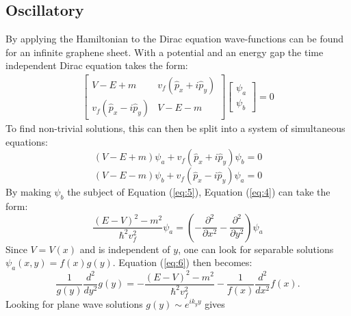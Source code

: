 			\subsection{Oscillatory}
			\label{Wave-functions - Oscillitary}
			By applying the Hamiltonian to the Dirac equation wave-functions can be found for an infinite graphene sheet. With a potential and an energy gap the time independent Dirac equation takes the form:
			\begin{align}
				\left[\begin{array}{ccc}
				V-E+m&v_{f}\left(\hat{p}_{x}+i\hat{p}_{y}\right)\\
				v_{f}\left(\hat{p}_{x}-i\hat{p}_{y}\right)&V-E-m
				\end{array}\right]
				\left[\begin{array}{ccc}
				\psi_a\\
				\psi_b
				\end{array}\right]
				=0
			\end{align}
			To find non-trivial solutions, this can then be split into a system of simultaneous equations:
			\begin{equation}\label{eq:4}
				\left(V-E+m\right)\psi_{a}+ v_{f}\left(\hat{p}_{x}+i\hat{p}_{y}\right)\psi_{b}=0
			\end{equation}
			\begin{equation}\label{eq:5}
				\left(V-E-m\right)\psi_{b}+v_{f}\left(\hat{p}_{x}-i\hat{p}_{y}\right)\psi_{a}=0
			\end{equation}
			By making $\psi_{b}$ the subject of Equation (\ref{eq:5}), Equation (\ref{eq:4}) can take the form:
			\begin{equation}
				\frac{\left(E-V\right)^{2}-m^{2}}{\hbar^{2}v_{f}^{2}}\psi_{a}=\left(-\frac{\partial^{2}}{\partial x^{2}}-\frac{\partial^{2}}{\partial y^{2}}\right)\psi_{a}
				\label{eq:6}
			\end{equation}
			Since $V=V(x)$ and is independent of $y$, one can look for separable solutions $\psi_{a}(x,y)=f(x)g(y)$. Equation (\ref{eq:6}) then becomes:
			\begin{equation}
				\frac{1}{g(y)}\frac{d^{2}}{dy^{2}}g(y)=-\frac{\left(E-V\right)^{2}-m^{2}}{\hbar^{2}v_{f}^{2}}-\frac{1}{f(x)}\frac{d^{2}}{dx^{2}}f(x).
			\end{equation}
			Looking for plane wave solutions $g(y)\sim e^{ik_{y}y}$ gives 

